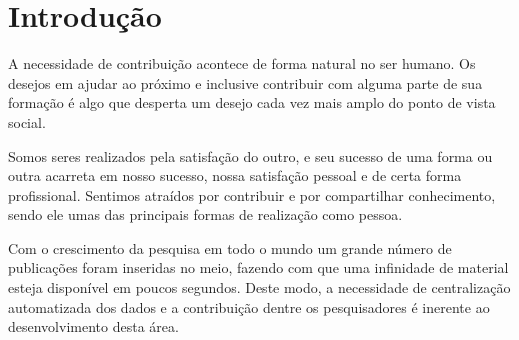 \documentclass[
	12pt,               %
	openright,          %
	twoside,            %
	a4paper,            %
	english,            %
	brazil              %
	]{abntex2}
\begin{document}
\listoffigures*
\cleardoublepage

\listoftables*
\cleardoublepage




\tableofcontents*
\cleardoublepage



\textual

\chapter[Introdução]{Introdução}

A necessidade de contribuição acontece de forma natural no ser humano. Os desejos em ajudar ao próximo e inclusive contribuir com alguma parte de sua formação é algo que desperta um desejo cada vez mais amplo do ponto de vista social.

Somos seres realizados pela satisfação do outro, e seu sucesso de uma forma ou outra acarreta em nosso sucesso, nossa satisfação pessoal e de certa forma profissional. Sentimos atraídos por contribuir e por compartilhar conhecimento, sendo ele umas das principais formas de realização como pessoa.

Com o crescimento da pesquisa em todo o mundo um grande número de publicações foram inseridas no meio, fazendo com que uma infinidade de material esteja disponível em poucos segundos. Deste modo, a necessidade de centralização automatizada dos dados e a contribuição dentre os pesquisadores é inerente ao desenvolvimento desta área. 
\end{document}
